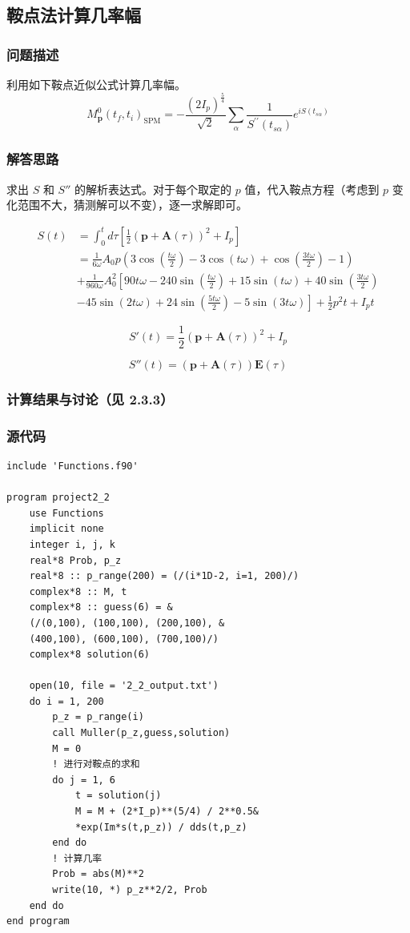 \documentclass{ctexart}
\begin{document}
\subsection{鞍点法计算几率幅}
\subsubsection{问题描述}
利用如下鞍点近似公式计算几率幅。
$$
M_{\mathbf{p}}^{0}\left(t_{f}, t_{i}\right) _\mathrm{SP M}=-\frac{\left(2 I_{p}\right)^{\frac{5}{4}}}{\sqrt{2}} \sum_{\alpha} \frac{1}{S^{\prime \prime}\left(t_{s \alpha}\right)} e^{i S\left(t_{s \alpha}\right)}
$$
\subsubsection{解答思路}
求出 $S$ 和 $S''$ 的解析表达式。对于每个取定的 $p$ 值，代入鞍点方程（考虑到 $p$ 变化范围不大，猜测解可以不变），逐一求解即可。

\begin{align*}
S(t)&=\int_{0}^{t} d \tau\left[\frac{1}{2}(\mathbf{p}+\mathbf{A}(\tau))^{2}+I_{p}\right]\\
&=\frac1{6\omega}A_{0} p\left(3 \cos \left(\frac{t \omega}{2}\right)-3 \cos (t \omega)+\cos \left(\frac{3 t \omega}{2}\right)-1\right)\\
&+\frac{1}{960 \omega}A_{0}^{2}\left[90 t \omega-240 \sin \left(\frac{t \omega}{2}\right)+15 \sin (t \omega)+40 \sin \left(\frac{3 t \omega}{2}\right)\right.\\
&\left.-45 \sin (2 t \omega)+24 \sin \left(\frac{5 t \omega}{2}\right)-5 \sin (3 t \omega)\right]+\frac12p^{2} t+I_pt
\end{align*}

$$
S'(t)=\frac{1}{2}(\mathbf{p}+\mathbf{A}(\tau))^{2}+I_{p}
$$

$$
S''(t)=(\mathbf{p}+\mathbf{A}(\tau))\mathbf E(\tau)
$$

\subsubsection{计算结果与讨论（见 2.3.3）}
\subsubsection{源代码}
\begin{lstlisting}
include 'Functions.f90'

program project2_2
	use Functions
	implicit none
	integer i, j, k
	real*8 Prob, p_z
	real*8 :: p_range(200) = (/(i*1D-2, i=1, 200)/)
	complex*8 :: M, t
	complex*8 :: guess(6) = &
	(/(0,100), (100,100), (200,100), &
	(400,100), (600,100), (700,100)/)
	complex*8 solution(6)
	
	open(10, file = '2_2_output.txt')
	do i = 1, 200
		p_z = p_range(i)
		call Muller(p_z,guess,solution)
		M = 0
		! 进行对鞍点的求和
		do j = 1, 6
			t = solution(j)
			M = M + (2*I_p)**(5/4) / 2**0.5&
			*exp(Im*s(t,p_z)) / dds(t,p_z)
		end do
		! 计算几率
		Prob = abs(M)**2
		write(10, *) p_z**2/2, Prob
	end do
end program
\end{lstlisting}
\end{document}
